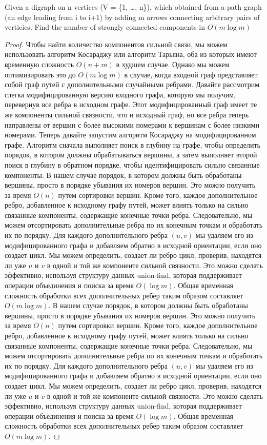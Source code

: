 \begin{prob}
Given a digraph on n vertices (V = \{1, \ldots, n\}), which obtained from a path graph (an edge leading from i to i+1) by adding m arrows connecting arbitrary pairs of verticies.
Find the number of strongly connected components in $O(m \log m)$
\end{prob}
\vskip 0.2in
\begin{proof}
Чтобы найти количество компонентов сильной связи, мы можем использовать алгоритм Косараджу или алгоритм Тарьяна, оба из которых имеют временную сложность $O(n + m)$ в худшем случае. Однако мы можем оптимизировать это до $O(m \log m)$ в случае, когда входной граф представляет собой граф путей с дополнительными случайными ребрами.
\vskip 0.1in
Давайте рассмотрим слегка модифицированную версию входного графа, которую мы получим, перевернув все ребра в исходном графе. Этот модифицированный граф имеет те же компоненты сильной связности, что и исходный граф, но все ребра теперь направлены от вершин с более высокими номерами к вершинам с более низкими номерами.
\vskip 0.1in
Теперь давайте запустим алгоритм Косараджу на модифицированном графе. Алгоритм сначала выполняет поиск в глубину на графе, чтобы определить порядок, в котором должны обрабатываться вершины, а затем выполняет второй поиск в глубину в обратном порядке, чтобы идентифицировать сильно связанные компоненты.
\vskip 0.1in
В нашем случае порядок, в котором должны быть обработаны вершины, просто в порядке убывания их номеров вершин. Это можно получить за время $O(n)$ путем сортировки вершин. Кроме того, каждое дополнительное ребро, добавленное к исходному графу путей, может влиять только на сильно связанные компоненты, содержащие конечные точки ребра. Следовательно, мы можем отсортировать дополнительные ребра по их конечным точкам и обработать их по порядку. Для каждого дополнительного ребра $(u,v)$ мы удаляем его из модифицированного графа и добавляем обратно в исходной ориентации, если оно создает цикл. Мы можем определить, создает ли ребро цикл, проверив, находятся ли уже $u$ и $v$ в одной и той же компоненте сильной связности. Это можно сделать эффективно, используя структуру данных union-find, которая поддерживает операции объединения и поиска за время $O(\log m)$. Общая временная сложность обработки всех дополнительных ребер таким образом составляет $O(m \log m)$.
\vskip 0.1in
В нашем случае порядок, в котором должны быть обработаны вершины, просто в порядке убывания их номеров вершин. Это можно получить за время $O(n)$ путем сортировки вершин. Кроме того, каждое дополнительное ребро, добавленное к исходному графу путей, может влиять только на сильно связанные компоненты, содержащие конечные точки ребра. Следовательно, мы можем отсортировать дополнительные ребра по их конечным точкам и обработать их по порядку. Для каждого дополнительного ребра $(u,v)$ мы удаляем его из модифицированного графа и добавляем обратно в исходной ориентации, если оно создает цикл. Мы можем определить, создает ли ребро цикл, проверив, находятся ли уже $u$ и $v$ в одной и той же компоненте сильной связности. Это можно сделать эффективно, используя структуру данных union-find, которая поддерживает операции объединения и поиска за время $O(\log m)$. Общая временная сложность обработки всех дополнительных ребер таким образом составляет $O(m \log m)$.

\end{proof}
